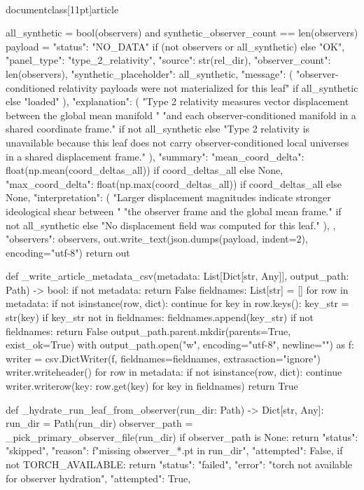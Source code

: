 \\documentclass[11pt]{article}
\begin{document}
\begin{CodeBlock}
    all_synthetic = bool(observers) and synthetic_observer_count == len(observers)
    payload = {
        "status": "NO_DATA" if (not observers or all_synthetic) else "OK",
        "panel_type": "type_2_relativity",
        "source": str(rel_dir),
        "observer_count": len(observers),
        "synthetic_placeholder": all_synthetic,
        "message": (
            "observer-conditioned relativity payloads were not materialized for this leaf"
            if all_synthetic
            else "loaded"
        ),
        "explanation": (
            "Type 2 relativity measures vector displacement between the global mean manifold "
            "and each observer-conditioned manifold in a shared coordinate frame."
            if not all_synthetic
            else "Type 2 relativity is unavailable because this leaf does not carry observer-conditioned local universes in a shared displacement frame."
        ),
        "summary": {
            "mean_coord_delta": float(np.mean(coord_deltas_all)) if coord_deltas_all else None,
            "max_coord_delta": float(np.max(coord_deltas_all)) if coord_deltas_all else None,
            "interpretation": (
                "Larger displacement magnitudes indicate stronger ideological shear between "
                "the observer frame and the global mean frame."
                if not all_synthetic
                else "No displacement field was computed for this leaf."
            ),
        },
        "observers": observers,
    }
    out.write_text(json.dumps(payload, indent=2), encoding="utf-8")
    return out


def _write_article_metadata_csv(metadata: List[Dict[str, Any]], output_path: Path) -> bool:
    if not metadata:
        return False
    fieldnames: List[str] = []
    for row in metadata:
        if not isinstance(row, dict):
            continue
        for key in row.keys():
            key_str = str(key)
            if key_str not in fieldnames:
                fieldnames.append(key_str)
    if not fieldnames:
        return False
    output_path.parent.mkdir(parents=True, exist_ok=True)
    with output_path.open("w", encoding="utf-8", newline="") as f:
        writer = csv.DictWriter(f, fieldnames=fieldnames, extrasaction="ignore")
        writer.writeheader()
        for row in metadata:
            if not isinstance(row, dict):
                continue
            writer.writerow({key: row.get(key) for key in fieldnames})
    return True


def _hydrate_run_leaf_from_observer(run_dir: Path) -> Dict[str, Any]:
    run_dir = Path(run_dir)
    observer_path = _pick_primary_observer_file(run_dir)
    if observer_path is None:
        return {
            "status": "skipped",
            "reason": f"missing observer_*.pt in {run_dir}",
            "attempted": False,
        }
    if not TORCH_AVAILABLE:
        return {
            "status": "failed",
            "error": "torch not available for observer hydration",
            "attempted": True,
        }


\end{CodeBlock}
\end{document}
